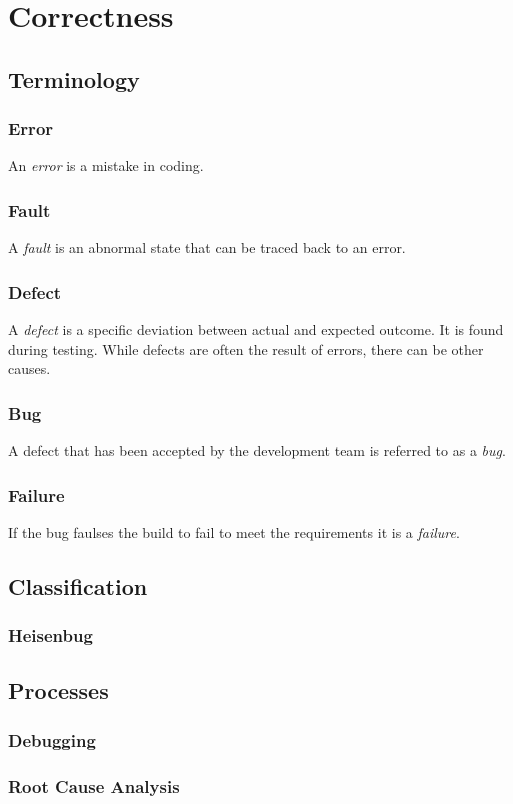 \section{Correctness}

\subsection{Terminology}

\subsubsection{Error}

An \textsl{error} is a mistake in coding.

\subsubsection{Fault}

A \textsl{fault} is an abnormal state that can be traced back to an error.

\subsubsection{Defect}

A \textsl{defect} is a specific deviation between actual and expected outcome. It is found during testing. While defects are often the result of errors, there can be other causes.

\subsubsection{Bug}

A defect that has been accepted by the development team is referred to as a \textsl{bug}.

\subsubsection{Failure}

If the bug faulses the build to fail to meet the requirements it is a \textsl{failure}.

\subsection{Classification}

\subsubsection{Heisenbug}

\subsection{Processes}

\subsubsection{Debugging}
\subsubsection{Root Cause Analysis}

